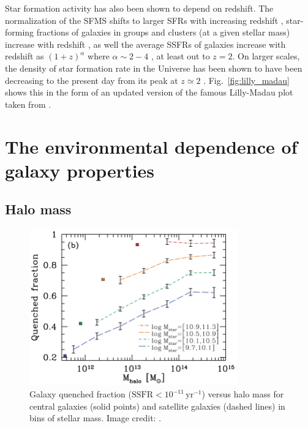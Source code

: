 Star formation activity has also been shown to depend on redshift.
The normalization of the SFMS shifts to larger SFRs with increasing
redshift \citep{karim2011, whitaker2012, lee2015, erfanianfar2016},
star-forming fractions of galaxies in groups and clusters (at a given
stellar mass) increase with redshift \citep{mcgee2011, hou2013,
  nantais2013}, as well the average SSFRs of galaxies increase with
redshift as $(1+z)^\alpha$ where $\alpha \sim 2-4$
\citep{oliver2010, whitaker2012}, at least out to $z=2$.  On larger
scales, the density of star formation rate in the Universe has been
shown to have been decreasing to the present day from its peak at $z
\simeq 2$ \citep[e.g.][]{madau1998, madau2014}.
Fig.~\ref{fig:lilly_madau} shows this in the form of an updated
version of the famous Lilly-Madau plot taken from \citet{madau2014}.

\section{The environmental dependence of galaxy properties}
\label{sec:enviro_dependence}

\subsection{Halo mass}
\label{sec:halo_mass}

\begin{figure}
  \centering
  \includegraphics[width=0.8\textwidth]{quenchFrac_wetzel.png}
  \caption{Galaxy quenched fraction ($\mathrm{SSFR} <
    10^{-11}\,\mathrm{yr^{-1}}$) versus halo mass for central galaxies
    (solid points) and satellite galaxies (dashed lines) in bins of stellar mass.  Image credit: \citet{wetzel2012}.}
  \label{fig:quenchFrac_wetzel}
\end{figure}

